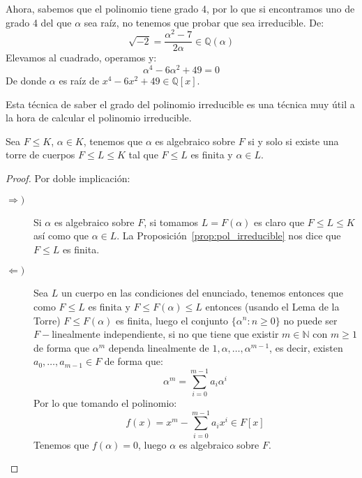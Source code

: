 \begin{ejemplo}
\begin{equation*}
    \end{equation*}
    Ahora, sabemos que el polinomio tiene grado 4, por lo que si encontramos uno de grado 4 del que $\alpha$ sea raíz, no tenemos que probar que sea irreducible. De:
    \begin{equation*}
        \sqrt{-2} = \dfrac{\alpha^2-7}{2\alpha} \in  \mathbb{Q}(\alpha)
    \end{equation*}
    Elevamos al cuadrado, operamos y:
    \begin{equation*}
        \alpha^4 - 6\alpha^2 + 49 = 0
    \end{equation*}
    De donde $\alpha$ es raíz de $x^4-6x^2+49\in \mathbb{Q}[x]$.
\end{ejemplo}

Esta técnica de saber el grado del polinomio irreducible es una técnica muy útil a la hora de calcular el polinomio irreducible.\\


\begin{prop}
    Sea $F\leq K$, $\alpha\in K$, tenemos que $\alpha$ es algebraico sobre $F$ si y solo si existe una torre de cuerpos $F\leq L \leq K$ tal que $F\leq L$ es finita y $\alpha\in L$.
    \begin{proof}
        Por doble implicación:
        \begin{description}
            \item [$\Longrightarrow )$] Si $\alpha$ es algebraico sobre $F$, si tomamos $L = F(\alpha)$ es claro que $F\leq L\leq K$ así como que $\alpha\in L$. La Proposición~\ref{prop:pol_irreducible} nos dice que $F\leq L$ es finita.
            \item [$\Longleftarrow )$] Sea $L$ un cuerpo en las condiciones del enunciado, tenemos entonces que como $F\leq L$ es finita y $F\leq F(\alpha)\leq L$ entonces (usando el Lema de la Torre) $F\leq F(\alpha)$ es finita, luego el conjunto $\{\alpha^n : n\geq 0\}$ no puede ser $F-$linealmente independiente, si no que tiene que existir $m\in \mathbb{N}$ con $m\geq 1$ de forma que $\alpha^m$ dependa linealmente de $1,\alpha,\ldots,\alpha^{m-1}$, es decir, existen $a_0,\ldots,a_{m-1}\in F$ de forma que:
                \begin{equation*}
                    \alpha^m = \sum_{i=0}^{m-1}a_i \alpha^i
                \end{equation*}
                Por lo que tomando el polinomio:
                \begin{equation*}
                    f(x) = x^m - \sum_{i=0}^{m-1}a_i x^i \in F[x]
                \end{equation*}
                Tenemos que $f(\alpha)=0$, luego $\alpha$ es algebraico sobre $F$.
        \end{description}
    \end{proof}
\end{prop}

